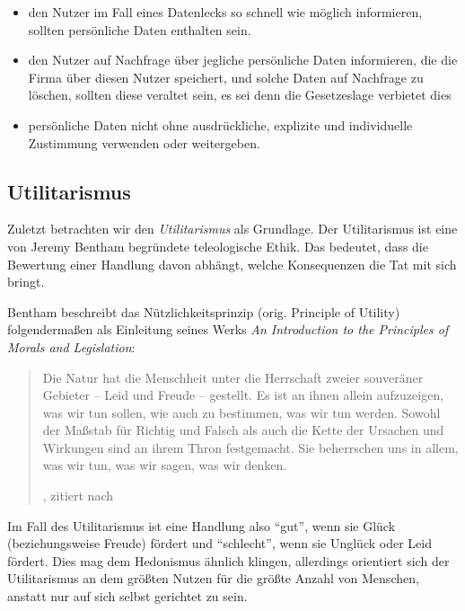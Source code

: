 \begin{itemize}
    \item den Nutzer im Fall eines Datenlecks so schnell wie möglich informieren, sollten persönliche Daten enthalten sein.
    \item den Nutzer auf Nachfrage über jegliche persönliche Daten informieren, die die Firma über diesen Nutzer speichert, und solche Daten auf Nachfrage zu löschen, sollten diese veraltet sein, es sei denn die Gesetzeslage verbietet dies
    \item persönliche Daten nicht ohne ausdrückliche, explizite und individuelle Zustimmung verwenden oder weitergeben.
\end{itemize}

\subsection{Utilitarismus}

Zuletzt betrachten wir den \emph{Utilitarismus} als Grundlage.
Der Utilitarismus ist eine von Jeremy Bentham begründete teleologische Ethik. Das bedeutet, dass die Bewertung einer Handlung davon abhängt,
welche Konsequenzen die Tat mit sich bringt.\cite{noauthor_teleological_nodate}

Bentham beschreibt das Nützlichkeitsprinzip (orig. Principle of Utility) folgendermaßen als Einleitung seines Werks \emph{An Introduction to the Principles of Morals and Legislation}:
\blockquote[\cite{bentham_principle_1780}, zitiert nach \cite{bensch_philosophisches_1984}]{
Die Natur hat die Menschheit unter die Herrschaft zweier souveräner Gebieter – Leid und Freude – gestellt. Es ist an ihnen allein aufzuzeigen, was wir tun sollen, wie auch zu bestimmen, was wir tun werden. 
Sowohl der Maßstab für Richtig und Falsch als auch die Kette der Ursachen und Wirkungen sind an ihrem Thron festgemacht. Sie beherrschen uns in allem, was wir tun, was wir sagen, was wir denken.
}

Im Fall des Utilitarismus ist eine Handlung also \enquote{gut}, wenn sie Glück (beziehungsweise Freude) fördert und \enquote{schlecht}, wenn sie Unglück oder Leid fördert.
Dies mag dem Hedonismus ähnlich klingen, allerdings orientiert sich der Utilitarismus an dem größten Nutzen für die größte Anzahl von Menschen, anstatt nur auf sich selbst gerichtet zu sein.\cite{white_principle_2001}



